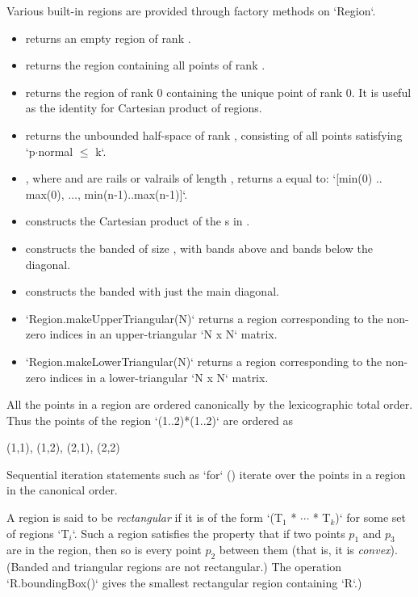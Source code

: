 Various built-in regions are provided through  factory
methods on \xcd`Region`.  
\begin{itemize}
\item {} returns an empty region of rank .
\item {} returns the region containing all points of
      rank .  
\item {} returns the region of rank 0 containing the
      unique point of rank 0.  It is useful as the identity for Cartesian
      product of regions.
\item {} returns the unbounded
      half-space of rank , consisting of all points 
      satisfying \xcdmath`p$\cdot$normal $\le$ k`.
\item {}, where  and 
      are  rails or valrails of length , returns a
       equal to: 
      \xcdmath`[min(0) .. max(0), $\ldots$, min(n-1)..max(n-1)]`.
\item {} constructs the Cartesian product of the
      s in .
\item {} constructs the
      banded  of size , with  bands above
      and  bands below the diagonal.
\item {} constructs the banded  with
      just the main diagonal.
\item \xcd`Region.makeUpperTriangular(N)` returns a region corresponding
to the non-zero indices in an upper-triangular \xcd`N x N` matrix.
\item \xcd`Region.makeLowerTriangular(N)` returns a region corresponding
to the non-zero indices in a lower-triangular \xcd`N x N` matrix.
\end{itemize}

All the points in a region are ordered canonically by the
lexicographic total order. Thus the points of the region \xcd`(1..2)*(1..2)`
are ordered as 
\begin{xten}
(1,1), (1,2), (2,1), (2,2)
\end{xten}
Sequential iteration statements such as \xcd`for` ()
iterate over the points in a region in the canonical order.

A region is said to be {\em rectangular} if it is of
the form \xcdmath`(T$_1$ * $\cdots$ * T$_k$)` for some set of regions
\xcdmath`T$_i$`. Such a
region satisfies the property that if two points $p_1$ and $p_3$ are
in the region, then so is every point $p_2$ between them (that is, it is {\em convex}). 
(Banded and triangular regions are not rectangular.)
The operation
\xcd`R.boundingBox()` gives the smallest rectangular region containing
\xcd`R`.)  

